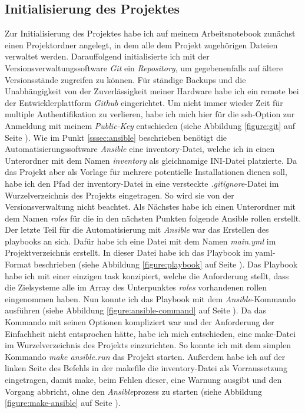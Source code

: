 \documentclass[11pt,a4paper]{article}
\begin{document}
\subsection{Initialisierung des Projektes}
Zur Initialisierung des Projektes habe ich auf meinem  Arbeitsnotebook zunächst
einen Projektordner angelegt, in dem alle dem Projekt zugehörigen Dateien verwaltet werden.
Darauffolgend initialisierte ich mit der Versionsverwaltungssoftware \emph{Git} ein \emph{Repository}, um
gegebenenfalls auf ältere Versionsstände zugreifen zu können. Für ständige Backups
und die Unabhängigkeit von der Zuverlässigkeit meiner Hardware habe ich ein
\gls{remote} bei der Entwicklerplattform \emph{Github} eingerichtet. Um nicht immer
wieder Zeit für multiple Authentifikation zu verlieren, habe ich mich
hier für die \gls{ssh}-Option zur Anmeldung mit meinem \emph{Public-Key} entschieden (siehe Abbildung \ref{figure:git} auf Seite \pageref{figure:git}).
Wie im Punkt \ref{sssec:ansible} beschrieben benötigt die Automatisierungssoftware \emph{Ansible}
eine \gls{inventory}-Datei, welche ich in einen Unterordner mit dem Namen \emph{inventory} als gleichnamige
\gls{INI}-Datei platzierte. Da das Projekt aber als Vorlage für mehrere potentielle
Installationen dienen soll, habe ich den Pfad der \gls{inventory}-Datei in eine versteckte
\emph{.gitignore}-Datei im Wurzelverzeichnis des Projekts eingetragen. So wird sie von der
Versionsverwaltung nicht beachtet.
Als Nächstes habe ich einen Unterordner mit dem Namen \emph{roles} für die in den nächsten Punkten
folgende Ansible \gls{rollen} erstellt. Der letzte Teil für die Automatisierung mit \emph{Ansible}
war das Erstellen des \gls{playbooks} an sich. Dafür habe ich eine Datei mit dem Namen
\emph{main.yml} im Projektverzeichnis erstellt. In dieser Datei habe ich das 
Playbook im \gls{yaml}-Format beschrieben (siehe Abbildung \ref{figure:playbook} auf Seite \pageref{figure:playbook}).
Das  Playbook habe ich mit einer einzigen \gls{task} konzipiert,
welche die Anforderung stellt, dass die Zielsysteme alle im Array des Unterpunktes \emph{roles}
vorhandenen \gls{rollen} eingenommen haben.
Nun konnte ich das Playbook mit dem \emph{Ansible}-Kommando ausführen (siehe Abbildung \ref{figure:ansible-command} auf Seite \pageref{figure:ansible-command}).
Da das Kommando mit seinen Optionen kompliziert war und der Anforderung
der Einfachheit nicht entsprochen hätte, habe ich mich entschieden, eine \gls{make}-Datei
im Wurzelverzeichnis des Projekts einzurichten. So konnte ich mit dem simplen Kommando
\emph{make ansible.run} das Projekt starten. Außerdem habe ich auf der linken Seite des Befehls
in der \gls{make}file die \gls{inventory}-Datei als Vorraussetzung eingetragen,
damit \gls{make}, beim Fehlen dieser, eine Warnung ausgibt und den Vorgang abbricht, ohne den
\emph{Ansible}prozess zu starten (siehe Abbildung \ref{figure:make-ansible} auf Seite \pageref{figure:make-ansible}).
\end{document}
